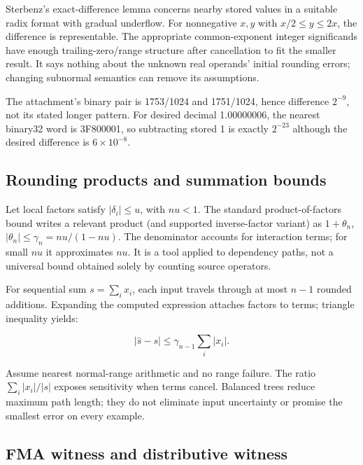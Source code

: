 Sterbenz's exact-difference lemma concerns nearby stored values in a suitable radix format with gradual underflow. For nonnegative \(x,y\) with \(x/2\le y\le2x\), the difference is representable. The appropriate common-exponent integer significands have enough trailing-zero/range structure after cancellation to fit the smaller result. It says nothing about the unknown real operands' initial rounding errors; changing subnormal semantics can remove its assumptions.

The attachment's binary pair is 1753/1024 and 1751/1024, hence difference \(2^{-9}\), not its stated longer pattern. For desired decimal 1.00000006, the nearest binary32 word is 3F800001, so subtracting stored 1 is exactly \(2^{-23}\) although the desired difference is \(6\times10^{-8}\).

\subsection{Rounding products and summation bounds}\label{01-foundations-i-ch011-rounding-products-and-summation-bounds}

\hypertarget{01-foundations-i-ch011-rounding-products-and-summation-bounds}{}

Let local factors satisfy \(|\delta_i|\le u\), with \(nu<1\). The standard product-of-factors bound writes a relevant product (and supported inverse-factor variant) as \(1+\theta_n\), \(|\theta_n|\le\gamma_n=nu/(1-nu)\). The denominator accounts for interaction terms; for small \(nu\) it approximates \(nu\). It is a tool applied to dependency paths, not a universal bound obtained solely by counting source operators.

For sequential sum \(s=\sum_i x_i\), each input travels through at most \(n-1\) rounded additions. Expanding the computed expression attaches factors to terms; triangle inequality yields:

\[
|\widehat s-s|\le\gamma_{n-1}\sum_i|x_i|.
\]

Assume nearest normal-range arithmetic and no range failure. The ratio \(\sum_i|x_i|/|s|\) exposes sensitivity when terms cancel. Balanced trees reduce maximum path length; they do not eliminate input uncertainty or promise the smallest error on every example.

\subsection{FMA witness and distributive witness}\label{01-foundations-i-ch011-fma-witness-and-distributive-witness}

